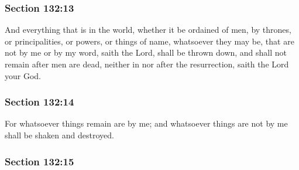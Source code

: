 
	\subsubsection{Section 132:13} %
		\label{DC132-13}

		And everything that is in the world, whether it be ordained of men, by thrones, or principalities, or powers, or things of name, whatsoever they may be, that are not by me or by my word, saith the Lord, shall be thrown down, and shall not remain after men are dead, neither in nor after the resurrection, saith the Lord your God.


	\subsubsection{Section 132:14} %
		\label{DC132-14}

		For whatsoever things remain are by me; and whatsoever things are not by me shall be shaken and destroyed.


	\subsubsection{Section 132:15} %
		\label{DC132-15}

